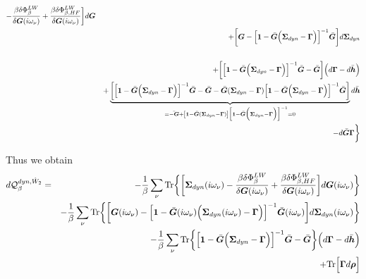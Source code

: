\documentclass[11pt,a4paper]{report}
\begin{document}
\begin{eqnarray}
-\frac{\beta\delta\Phi^{LW}_\beta}{\delta\bm{G}(i\omega_\nu)}
+\frac{\beta\delta\Phi^{LW}_{\beta,HF}}{\delta\bm{G}(i\omega_\nu)}
\biggr]d\bm{G}
\nonumber\\
&&+\biggl[
\bm{G}-\Bigl[\bm{1}-\bar{\bm{G}}
\Bigl(\bm{\Sigma}_{dyn}-\bm{\Gamma}\Bigr)\Bigr]^{-1}
\bar{\bm{G}}\biggr]d\bm{\Sigma}_{dyn}
\nonumber\\
&&
\nonumber\\
&&+\biggl[
\Bigl[\bm{1}-\bar{\bm{G}}
\Bigl(\bm{\Sigma}_{dyn}-\bm{\Gamma}\Bigr)\Bigr]^{-1}
\bar{\bm{G}}
-\bar{\bm{G}}
\biggr]\Bigl(d\bm{\Gamma}-d\bar{\bm{h}}\Bigr)
\nonumber\\
&&
+\underbrace{\biggl[
\Bigl[\bm{1}-\bar{\bm{G}}
\Bigl(\bm{\Sigma}_{dyn}-\bm{\Gamma}\Bigr)\Bigr]^{-1}
\bar{\bm{G}}
-\bar{\bm{G}}
-\bar{\bm{G}}(\bm{\Sigma}_{dyn}-\bm{\Gamma})
\Bigl[\bm{1}-\bar{\bm{G}}
\Bigl(\bm{\Sigma}_{dyn}-\bm{\Gamma}\Bigr)\Bigr]^{-1}
\bar{\bm{G}}
\biggr]}_{
=\bar{-\bm{G}}
+\left[\bm{1}-\bar{\bm{G}}(\bm{\Sigma}_{dyn}-\bm{\Gamma})\right]
\Bigl[\bm{1}-\bar{\bm{G}}
\Bigl(\bm{\Sigma}_{dyn}-\bm{\Gamma}\Bigr)\Bigr]^{-1}
=0}
d\bar{\bm{h}}
\nonumber\\
&&
-d\bar{\bm{G}}\bm{\Gamma}
\biggr\rbrace
\end{eqnarray}

Thus we obtain
\begin{eqnarray}
d\mathcal{Q}_{\beta}^{dyn,\hat{W}_2}
&=&
-\frac{1}{\beta}\sum_\nu\mathrm{Tr}\biggl\lbrace
\biggr[\bm{\Sigma}_{dyn}(i\omega_\nu)
-\frac{\beta\delta\Phi^{LW}_\beta}{\delta\bm{G}(i\omega_\nu)}
+\frac{\beta\delta\Phi^{LW}_{\beta,HF}}{\delta\bm{G}(i\omega_\nu)}
\biggr]d\bm{G}(i\omega_\nu)\biggr\rbrace
\nonumber\\
&&
-\frac{1}{\beta}\sum_\nu\mathrm{Tr}\biggl\lbrace
\biggl[
\bm{G}(i\omega_\nu)-\Bigl[\bm{1}-\bar{\bm{G}}(i\omega_\nu)
\Bigl(\bm{\Sigma}_{dyn}(i\omega_\nu)-\bm{\Gamma}\Bigr)\Bigr]^{-1}
\bar{\bm{G}}(i\omega_\nu)\biggr]d\bm{\Sigma}_{dyn}(i\omega_\nu)
\biggr\rbrace
\nonumber\\
&&
-\frac{1}{\beta}\sum_\nu\mathrm{Tr}\biggl\lbrace
\Bigl[\bm{1}-\bar{\bm{G}}
\Bigl(\bm{\Sigma}_{dyn}-\bm{\Gamma}\Bigr)\Bigr]^{-1}
\bar{\bm{G}}
-\bar{\bm{G}}
\biggr\rbrace
\Bigl(d\bm{\Gamma}-d\bar{\bm{h}}\Bigr)
\nonumber\\
&&+\mathrm{Tr}\Bigl[\bm{\Gamma}d\bm{\rho}\Bigr]
\end{eqnarray}
\end{document}
